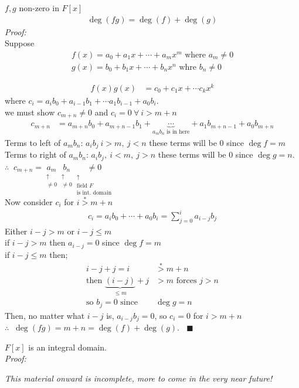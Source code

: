 \setcounter{section}{9}
\begin{lemma}
    $f,g$ non-zero in $F[x]$
    \begin{align}
        \deg(fg)= \deg(f)+\deg(g) \nonumber
    \end{align}
    \textit{Proof:} \\
    \noindent Suppose 
    \begin{align}
        f(x)= a_0 +a_1x+\cdots + a_mx^m \text{ where } a_m \neq 0 \nonumber \\
        g(x)= b_0 +b_1x + \cdots + b_nx^n \text{ whre } b_n\neq 0 \nonumber
    \end{align}

    \begin{align}
        f(x)g(x) &= c_0 + c_1x + \cdots c_kx^k \nonumber
    \end{align}
    where $c_i = a_ib_0 + a_{i-1}b_1 + \cdots a_1b_{i-1} + a_0 b_i$. \\
    \noindent we must show $c_{m+n}\neq 0$ and $c_i = 0 \ \forall \ i >m+n$
    \begin{align}
        c_{m+n} &= a_{m+n} b_0 + a_{m+n-1}b_1 + \underbrace{\cdots}_{a_mb_n \text{ is in here}}+ a_1b_{m+n-1}+a_0b_{m+n} \nonumber
    \end{align}
    Terms to left of $a_mb_n$: $a_ib_j \ i>m, \ j <n$ these terms will be $0$ since $\deg f = m$ \\
    \noindent Terms to right of $a_mb_n$: $a_ib_j, \ i<m, \ j>n$ these terms will be $0$ since $\deg g = n$. \\

    $\therefore \ $ $c_{m+n}=\underset{\substack{\uparrow \\ \neq 0}}{a_m}\underset{\substack{\uparrow \\ \neq 0}}{b_n} \underset{\substack{\uparrow \ \ \\ \text{field }F \\ \text{is int. domain}}}{\neq 0} $ \\
    Now consider $c_i$ for $i\overset{*}{>}m+n$ 
    \begin{align}
        c_i = a_ib_0 + \cdots + a_0b_i = \sum_{j=0}^i a_{i-j}b_j \nonumber
    \end{align}
    Either $i-j>m$ or $i-j \leq m$ \\
    \noindent if $i-j>m$ then $a_{i-j}=0$ since $\deg f = m$ \\
    \noindent if $i-j \leq m$ then;
    \begin{align}
        i-j + j = i &\overset{*}{>} m + n \nonumber \\
        \text{then } \underbrace{(i-j)}_{\leq m} +j &> m  \text{ forces }j>n \nonumber \\
        \text{so }b_j = 0 \text{ since } &\deg g = n  \nonumber
    \end{align}
    Then, no matter what $i-j$ is, $a_{i-j}b_j=0$, so $c_i=0$ for $i>m+n$ \\ \steezybreak
    $\therefore \ $ $\deg (fg) = m + n = \deg(f)+\deg(g). \ \ \ \ \blacksquare$
\end{lemma}
\setcounter{dummy_lemma}{0}
\begin{corollary}
    $F[x]$ is an integral domain. \\ \steezybreak
    \textit{Proof:} 
\end{corollary}
\steezybreak \textit{This material onward is incomplete, more to come in the very near future!}

